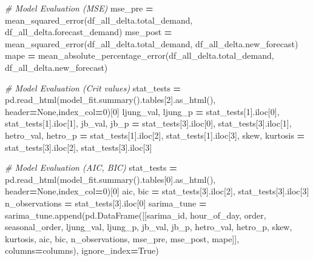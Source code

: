 \documentclass[mstat,12pt]{unswthesis}
\newenvironment{Shaded}{\begin{snugshade}}{\end{snugshade}}
\newcommand{\CommentTok}[1]{\textcolor[rgb]{0.56,0.35,0.01}{\textit{#1}}}
\newcommand{\DecValTok}[1]{\textcolor[rgb]{0.00,0.00,0.81}{#1}}
\newcommand{\NormalTok}[1]{#1}
\newcommand{\OperatorTok}[1]{\textcolor[rgb]{0.81,0.36,0.00}{\textbf{#1}}}
\newcommand{\VariableTok}[1]{\textcolor[rgb]{0.00,0.00,0.00}{#1}}
\begin{document}
\begin{Shaded}
\begin{Highlighting}[]
        \CommentTok{\# Model Evaluation (MSE)}
\NormalTok{        mse\_pre }\OperatorTok{=}\NormalTok{ mean\_squared\_error(df\_all\_delta.total\_demand,}
\NormalTok{            df\_all\_delta.forecast\_demand)}
\NormalTok{        mse\_post }\OperatorTok{=}\NormalTok{ mean\_squared\_error(df\_all\_delta.total\_demand,}
\NormalTok{            df\_all\_delta.new\_forecast)}
\NormalTok{        mape }\OperatorTok{=}\NormalTok{ mean\_absolute\_percentage\_error(df\_all\_delta.total\_demand,}
\NormalTok{            df\_all\_delta.new\_forecast)}

        \CommentTok{\# Model Evaluation (Crit values)}
\NormalTok{        stat\_tests }\OperatorTok{=}\NormalTok{ pd.read\_html(model\_fit.summary().tables[}\DecValTok{2}\NormalTok{].as\_html(),}
\NormalTok{            header}\OperatorTok{=}\VariableTok{None}\NormalTok{,index\_col}\OperatorTok{=}\DecValTok{0}\NormalTok{)[}\DecValTok{0}\NormalTok{]}
\NormalTok{        ljung\_val, ljung\_p }\OperatorTok{=}\NormalTok{ stat\_tests[}\DecValTok{1}\NormalTok{].iloc[}\DecValTok{0}\NormalTok{], stat\_tests[}\DecValTok{1}\NormalTok{].iloc[}\DecValTok{1}\NormalTok{], }
\NormalTok{        jb\_val, jb\_p }\OperatorTok{=}\NormalTok{ stat\_tests[}\DecValTok{3}\NormalTok{].iloc[}\DecValTok{0}\NormalTok{], stat\_tests[}\DecValTok{3}\NormalTok{].iloc[}\DecValTok{1}\NormalTok{], }
\NormalTok{        hetro\_val, hetro\_p }\OperatorTok{=}\NormalTok{ stat\_tests[}\DecValTok{1}\NormalTok{].iloc[}\DecValTok{2}\NormalTok{], stat\_tests[}\DecValTok{1}\NormalTok{].iloc[}\DecValTok{3}\NormalTok{], }
\NormalTok{        skew, kurtosis }\OperatorTok{=}\NormalTok{ stat\_tests[}\DecValTok{3}\NormalTok{].iloc[}\DecValTok{2}\NormalTok{], stat\_tests[}\DecValTok{3}\NormalTok{].iloc[}\DecValTok{3}\NormalTok{]}

        \CommentTok{\# Model Evaluation (AIC, BIC)}
\NormalTok{        stat\_tests }\OperatorTok{=}\NormalTok{ pd.read\_html(model\_fit.summary().tables[}\DecValTok{0}\NormalTok{].as\_html(),}
\NormalTok{            header}\OperatorTok{=}\VariableTok{None}\NormalTok{,index\_col}\OperatorTok{=}\DecValTok{0}\NormalTok{)[}\DecValTok{0}\NormalTok{]}
\NormalTok{        aic, bic }\OperatorTok{=}\NormalTok{ stat\_tests[}\DecValTok{3}\NormalTok{].iloc[}\DecValTok{2}\NormalTok{], stat\_tests[}\DecValTok{3}\NormalTok{].iloc[}\DecValTok{3}\NormalTok{]}
\NormalTok{        n\_observations }\OperatorTok{=}\NormalTok{ stat\_tests[}\DecValTok{3}\NormalTok{].iloc[}\DecValTok{0}\NormalTok{]}
\NormalTok{        sarima\_tune }\OperatorTok{=}\NormalTok{ sarima\_tune.append(pd.DataFrame([[sarima\_id, }
\NormalTok{            hour\_of\_day, order, seasonal\_order, ljung\_val, ljung\_p, }
\NormalTok{            jb\_val, jb\_p, hetro\_val, hetro\_p, skew, kurtosis, aic, }
\NormalTok{            bic, n\_observations, mse\_pre, mse\_post, mape]], }
\NormalTok{            columns}\OperatorTok{=}\NormalTok{columns), ignore\_index}\OperatorTok{=}\VariableTok{True}\NormalTok{)}
\end{Highlighting}
\end{Shaded}
\end{document}
